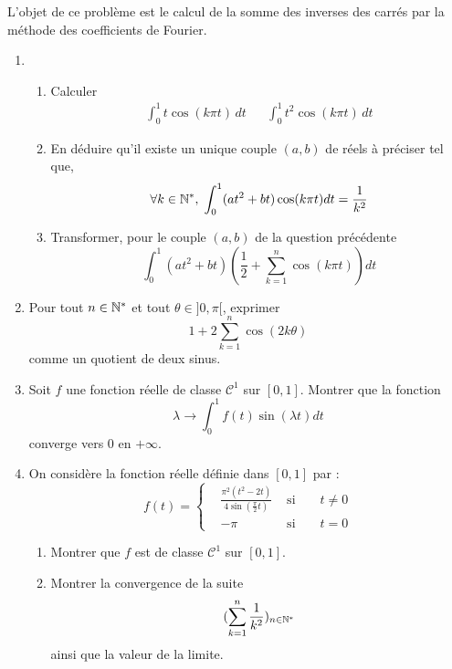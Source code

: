 L'objet de ce problème est le calcul de la somme des inverses des carrés par la méthode des coefficients de Fourier.
\begin{enumerate}
\item \begin{enumerate}
\item Calculer
\begin{align*}
 \int_0^1t\cos(k\pi t)\,dt & & \int_0^1t^2\cos(k\pi t)\,dt
\end{align*}
\item En déduire qu'il existe un unique couple $(a,b)$ de réels à préciser tel que,
\begin{displaymath}
\forall k \in \mathbb{N}^*,\; \int_0^1(at^2+bt)\cos(k\pi t)dt = \frac{1}{k^2} 
\end{displaymath}

\item Transformer, pour le couple $(a,b)$ de la question précédente
\[\int_0 ^1(at^2+bt)\left( \frac{1}{2} + \sum_{k=1}^n \cos (k\pi t)\right) dt \]
\end{enumerate}
\item Pour tout $n \in \mathbb{N} ^*$ et tout $\theta \in]0 , \pi[$, exprimer
\[1+2\sum_{k=1}^n\cos (2k\theta)\]
comme un quotient de deux sinus.
\item Soit $f$ une fonction réelle de classe $\mathcal{C}^1$ sur $[0,1]$. Montrer que la fonction
\[ \lambda \rightarrow \int _0 ^1 f(t) \sin(\lambda t) dt \]
converge vers 0 en $+\infty$.
\item On considère la fonction réelle définie dans $[0,1]$ par :
\begin{displaymath}
f(t) =\left\lbrace  
\begin{aligned}
&\frac{\pi^2 (t^2-2t)}{4\sin(\frac{\pi}{2}t)} &\text{ si }&  &t\neq 0 \\ 
& -\pi   &\text{ si }&  &t=0
\end{aligned}
\right. 
\end{displaymath}
\begin{enumerate}
\item Montrer que $f$ est de classe $\mathcal{C}^1$ sur $[0,1]$.
\item Montrer la convergence de la suite
\[(\sum_{k=1}^n \frac{1}{k^2})_{n\in\mathbb{N}^*}\]
ainsi que la valeur de la limite.
\end{enumerate}

\end{enumerate}
